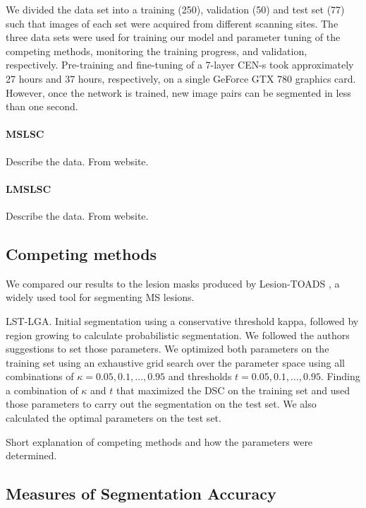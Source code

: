
We divided the data set into a training (250), validation (50) and test set (77)
such that images of each set were acquired from different scanning sites. The
three data sets were used for training our model and parameter tuning of the
competing methods, monitoring the training progress, and validation,
respectively. Pre-training and fine-tuning of a 7-layer CEN-s took approximately
27 hours and 37 hours, respectively, on a single GeForce GTX 780 graphics card.
However, once the network is trained, new image pairs can be segmented in less
than one second.

\paragraph{MSLSC}
Describe the data. From website.

\paragraph{LMSLSC}
Describe the data. From website.

\subsection{Competing methods}

We compared our results to the lesion masks produced by Lesion-TOADS
\cite{shiee2010topology}, a widely used tool for segmenting MS lesions.

LST-LGA. Initial segmentation using a conservative threshold kappa, followed by
region growing to calculate probabilistic segmentation. We followed the authors
suggestions to set those parameters. We optimized both parameters on the
training set using an exhaustive grid search over the parameter space using all
combinations of $\kappa = {0.05, 0.1, \dotsc, 0.95}$ and thresholds $t = 0.05,
0.1, \dotsc, 0.95$. Finding a combination of $\kappa$ and $t$ that maximized the
DSC on the training set and used those parameters to carry out the segmentation
on the test set. We also calculated the optimal parameters on the test set.

Short explanation of competing methods and how the parameters were determined.

\subsection{Measures of Segmentation Accuracy}

